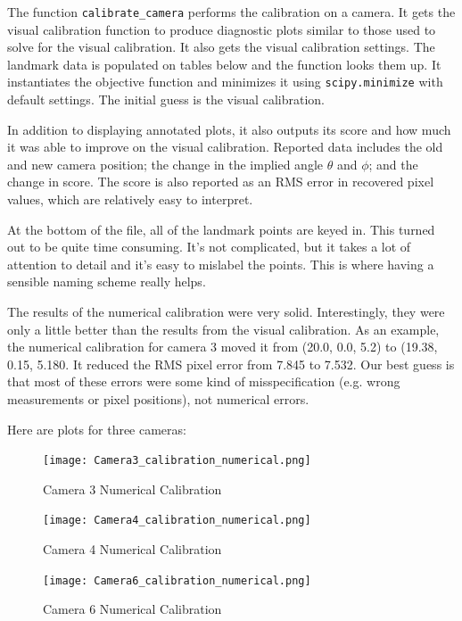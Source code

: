 \documentclass{article}
\begin{document}
The function \texttt{calibrate\_camera} performs the calibration on a camera.
It gets the visual calibration function to produce diagnostic plots similar to those
used to solve for the visual calibration.  It also gets the visual calibration settings.
The landmark data is populated on tables below and the function looks them up.
It instantiates the objective function and minimizes it using \texttt{scipy.minimize} 
with default settings.  The initial guess is the visual calibration.

In addition to displaying annotated plots, it also outputs its score and how much
it was able to improve on the visual calibration.
Reported data includes the old and new camera position; 
the change in the implied angle $\theta$ and $\phi$; and the change in score.
The score is also reported as an RMS error in recovered pixel values, 
which are relatively easy to interpret.

At the bottom of the file, all of the landmark points  are keyed  in.
This turned out to be quite time consuming.  It's not complicated, but it takes
a lot of attention to detail and it's easy to mislabel the points.
This is where having a sensible naming scheme really helps.

The results of the numerical calibration were very solid.
Interestingly, they were only a little better than the results from the visual calibration.
As an example, the numerical calibration for camera 3 moved it from (20.0, 0.0, 5.2)
to (19.38, 0.15, 5.180.  It reduced the RMS pixel error from 7.845 to 7.532.
Our best guess is that most of these errors were some kind of misspecification
(e.g. wrong measurements or pixel positions), not numerical errors.

Here are plots for three cameras:

\newpage
\begin{figure}[H]
\center
\texttt{[image: Camera3\_calibration\_numerical.png]}
\caption*{Camera 3 Numerical Calibration}

\texttt{[image: Camera4\_calibration\_numerical.png]}
\caption*{Camera 4 Numerical Calibration}
\end{figure}

\begin{figure}[H]
\center
\texttt{[image: Camera6\_calibration\_numerical.png]}
\caption*{Camera 6 Numerical Calibration}
\end{figure}

\newpage
\end{document}
